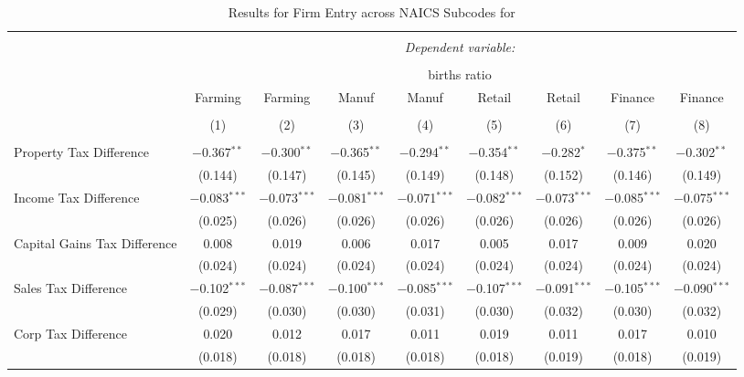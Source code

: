 
\begin{table}[!htbp] \centering 
  \caption{Results for Firm Entry across NAICS Subcodes for } 
  \label{naics} 
\small 
\begin{tabular}{@{\extracolsep{5pt}}lcccccccc} 
\\[-1.8ex]\hline 
\hline \\[-1.8ex] 
 & \multicolumn{8}{c}{\textit{Dependent variable:}} \\ 
\cline{2-9} 
\\[-1.8ex] & \multicolumn{8}{c}{births ratio} \\ 
 & Farming & Farming & Manuf & Manuf & Retail & Retail & Finance & Finance \\ 
\\[-1.8ex] & (1) & (2) & (3) & (4) & (5) & (6) & (7) & (8)\\ 
\hline \\[-1.8ex] 
 Property Tax Difference & $-$0.367$^{**}$ & $-$0.300$^{**}$ & $-$0.365$^{**}$ & $-$0.294$^{**}$ & $-$0.354$^{**}$ & $-$0.282$^{*}$ & $-$0.375$^{**}$ & $-$0.302$^{**}$ \\ 
  & (0.144) & (0.147) & (0.145) & (0.149) & (0.148) & (0.152) & (0.146) & (0.149) \\ 
  Income Tax Difference & $-$0.083$^{***}$ & $-$0.073$^{***}$ & $-$0.081$^{***}$ & $-$0.071$^{***}$ & $-$0.082$^{***}$ & $-$0.073$^{***}$ & $-$0.085$^{***}$ & $-$0.075$^{***}$ \\ 
  & (0.025) & (0.026) & (0.026) & (0.026) & (0.026) & (0.026) & (0.026) & (0.026) \\ 
  Capital Gains Tax Difference & 0.008 & 0.019 & 0.006 & 0.017 & 0.005 & 0.017 & 0.009 & 0.020 \\ 
  & (0.024) & (0.024) & (0.024) & (0.024) & (0.024) & (0.024) & (0.024) & (0.024) \\ 
  Sales Tax Difference & $-$0.102$^{***}$ & $-$0.087$^{***}$ & $-$0.100$^{***}$ & $-$0.085$^{***}$ & $-$0.107$^{***}$ & $-$0.091$^{***}$ & $-$0.105$^{***}$ & $-$0.090$^{***}$ \\ 
  & (0.029) & (0.030) & (0.030) & (0.031) & (0.030) & (0.032) & (0.030) & (0.032) \\ 
  Corp Tax Difference & 0.020 & 0.012 & 0.017 & 0.011 & 0.019 & 0.011 & 0.017 & 0.010 \\ 
  & (0.018) & (0.018) & (0.018) & (0.018) & (0.018) & (0.019) & (0.018) & (0.019) \\ 

\end{tabular}
\end{table}
